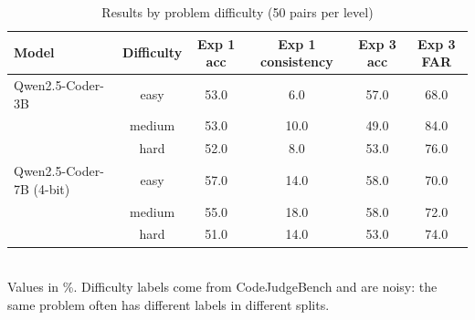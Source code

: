 \begin{table}[t]
\centering
\caption{Results by problem difficulty (50 pairs per level)}
\label{tab:t5_difficulty}
\footnotesize
\setlength{\tabcolsep}{3pt}
\begin{tabular}{lccccc}
\hline
Model & Difficulty & Exp 1 acc & Exp 1 consistency & Exp 3 acc & Exp 3 FAR \\
\hline
Qwen2.5-Coder-3B & easy & 53.0 & 6.0 & 57.0 & 68.0 \\
 & medium & 53.0 & 10.0 & 49.0 & 84.0 \\
 & hard & 52.0 & 8.0 & 53.0 & 76.0 \\
Qwen2.5-Coder-7B (4-bit) & easy & 57.0 & 14.0 & 58.0 & 70.0 \\
 & medium & 55.0 & 18.0 & 58.0 & 72.0 \\
 & hard & 51.0 & 14.0 & 53.0 & 74.0 \\
\hline
\end{tabular}
\\[2pt]
{\scriptsize Values in \%. Difficulty labels come from CodeJudgeBench and are noisy: the same problem often has different labels in different splits.}
\end{table}
